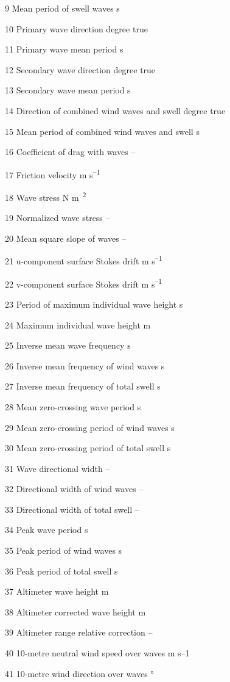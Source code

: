 9 Mean period of swell waves s

10 Primary wave direction degree true

11 Primary wave mean period s

12 Secondary wave direction degree true

13 Secondary wave mean period s

14 Direction of combined wind waves and swell degree true

15 Mean period of combined wind waves and swell s

16 Coefficient of drag with waves --

17 Friction velocity m s\textsuperscript{--1}

18 Wave stress N m\textsuperscript{--2}

19 Normalized wave stress --

20 Mean square slope of waves --

21 u-component surface Stokes drift m s\textsuperscript{--1}

22 v-component surface Stokes drift m s\textsuperscript{--1}

23 Period of maximum individual wave height s

24 Maximum individual wave height m

25 Inverse mean wave frequency s

26 Inverse mean frequency of wind waves s

27 Inverse mean frequency of total swell s

28 Mean zero-crossing wave period s

29 Mean zero-crossing period of wind waves s

30 Mean zero-crossing period of total swell s

31 Wave directional width --

32 Directional width of wind waves --

33 Directional width of total swell --

34 Peak wave period s

35 Peak period of wind waves s

36 Peak period of total swell s

37 Altimeter wave height m

38 Altimeter corrected wave height m

39 Altimeter range relative correction --

40 10-metre neutral wind speed over waves m s--1

41 10-metre wind direction over waves °

